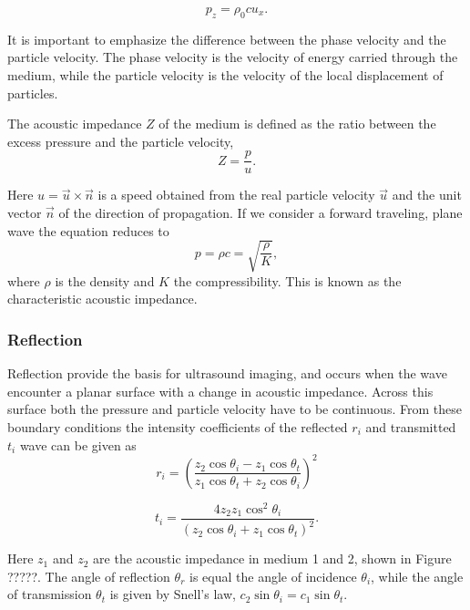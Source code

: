 \begin{equation}
\label{pressure wave}
p_z = \rho_0 c u_x.
\end{equation}

It is important to emphasize the difference between the phase velocity and the particle velocity. The phase velocity is the velocity of energy carried through the medium, while the particle velocity is the velocity of the local displacement of particles.

The acoustic impedance $Z$ of the medium is defined as the ratio between the excess pressure and the particle velocity,
\begin{equation}
\label{acoustic impedance}
 Z = \frac{p}{u}.
\end{equation}
 
Here $u = \vec{u}\times \vec{n}$ is a speed obtained from the real particle velocity $\vec{u}$ and the unit vector $\vec{n}$ of the direction of propagation. If we consider a forward traveling, plane wave the equation reduces to\cite{Healey2012} 
\begin{equation}
p = \rho c = \sqrt{\frac{\rho}{K}},
\end{equation}
 where $\rho$ is the density and $K$ the compressibility. This is known as the characteristic acoustic impedance.
\subsubsection{Reflection}
Reflection provide the basis for ultrasound imaging, and occurs when the wave encounter a planar surface with a change in acoustic impedance. Across this surface both the pressure and particle velocity have to be continuous. From these boundary conditions 
the intensity coefficients of the reflected $r_i$ and transmitted $t_i$ wave can be given as \cite{wells1969physical}
\begin{equation}
\label{fresnel}
r_i = \left(\frac{z_2 \cos \theta_i - z_1 \cos \theta_t}{z_1 \cos \theta_t + z_2 \cos \theta_i}\right)^2
\end{equation}

\begin{equation}
\label{fresnel2}
t_i = \frac{4z_2 z_1 \cos^2 \theta_i}{(z_2 \cos \theta_i + z_1 \cos \theta_t)^2}.
\end{equation}

Here $z_1$ and $z_2$ are the acoustic impedance in medium 1 and 2, shown in Figure ?????. The angle of reflection $\theta_r$ is equal the angle of incidence $\theta_i$, while the angle of transmission $\theta_t$ is given by Snell's law\cite{blackstock2000fundamentals}, $ c_2 \sin \theta_i = c_1 \sin \theta_t$. 

